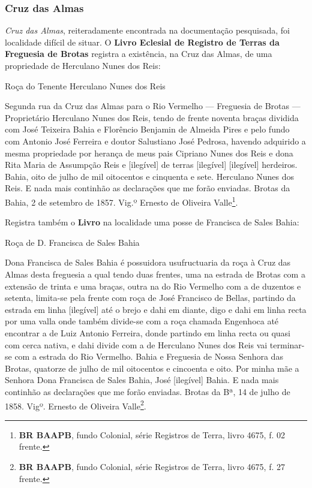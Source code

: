 \subsubsection{Cruz das Almas}\label{subsubsec:cruzalm}

\textit{Cruz das Almas}, reiteradamente encontrada na documentação pesquisada, foi localidade difícil de situar. O \textbf{Livro Eclesial de Registro de Terras da Freguesia de Brotas} registra a existência, na Cruz das Almas, de uma propriedade de Herculano Nunes dos Reis:

\begin{citacao}
Roça do Tenente Herculano Nunes dos Reis

Segunda rua da Cruz das Almas para o Rio Vermelho --- Freguesia de Brotas --- Proprietário Herculano Nunes dos Reis, tendo de frente noventa braças dividida com José Teixeira Bahia e Florêncio Benjamin de Almeida Pires e pelo fundo com Antonio José Ferreira e doutor Salustiano José Pedrosa, havendo adquirido a mesma propriedade por herança de meus pais Cipriano Nunes dos Reis e dona Rita Maria de Assumpção Reis e [ilegível] de terras [ilegível] [ilegível] herdeiros. Bahia, oito de julho de mil oitocentos e cinquenta e sete. Herculano Nunes dos Reis. E nada mais continhão as declarações que me forão enviadas. Brotas da Bahia, 2 de setembro de 1857. Vig.º Ernesto de Oliveira Valle\footnote{\textbf{BR BAAPB}, fundo Colonial, série Registros de Terra, livro 4675, f. 02 frente.}.
\end{citacao}

Registra também o \textbf{Livro} na localidade uma posse de Francisca de Sales Bahia:

\begin{citacao}
Roça de D. Francisca de Sales Bahia

Dona Francisca de Sales Bahia é possuidora usufructuaria da roça à Cruz das Almas desta freguesia a qual tendo duas frentes, uma na estrada de Brotas com a extensão de trinta e uma braças, outra na do Rio Vermelho com a de duzentos e setenta, limita-se pela frente com roça de José Francisco de Bellas, partindo da estrada em linha [ilegível] até o brejo e dahi em diante, digo e dahi em linha recta por uma valla onde também divide-se com a roça chamada Engenhoca até encontrar a de Luiz Antonio Ferreira, donde partindo em linha recta ou quasi com cerca nativa, e dahi divide com a de Herculano Nunes dos Reis vai terminar-se com a estrada do Rio Vermelho. Bahia e Freguesia de Nossa Senhora das Brotas, quatorze de julho de mil oitocentos e cincoenta e oito. Por minha mãe a Senhora Dona Francisca de Sales Bahia, José [ilegível] Bahia. E nada mais continhão as declarações que me forão enviadas. Brotas da Bª, 14 de julho de 1858. Vigº. Ernesto de Oliveira Valle\footnote{\textbf{BR BAAPB}, fundo Colonial, série Registros de Terra, livro 4675, f. 27 frente.}.
\end{citacao}

